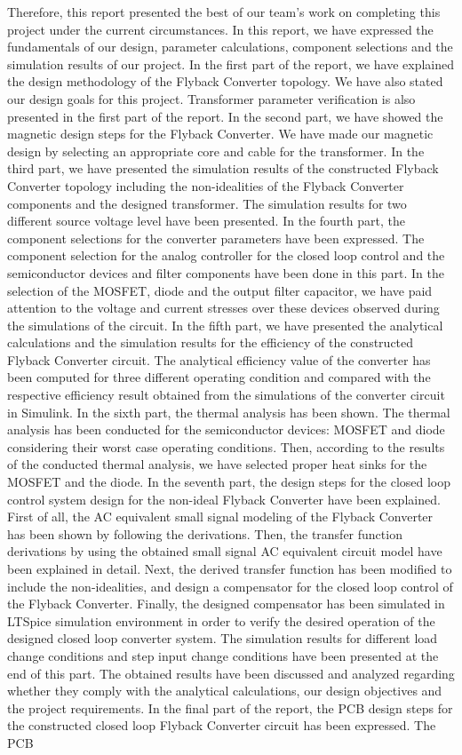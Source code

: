 Therefore, this report presented the best of our team's work on completing this project under the current circumstances. In this report, we have expressed the fundamentals of our design, parameter calculations, component selections and the simulation results of our project. In the first part of the report, we have explained the design methodology of the Flyback Converter topology. We have also stated our design goals for this project. Transformer parameter verification is also presented in the first part of the report. In the second part, we have showed the magnetic design steps for the Flyback Converter. We have made our magnetic design by selecting an appropriate core and cable for the transformer. In the third part, we have presented the simulation results of the constructed Flyback Converter topology including the non-idealities of the Flyback Converter components and the designed transformer. The simulation results for two different source voltage level have been presented. In the fourth part, the component selections for the converter parameters have been expressed. The component selection for the analog controller for the closed loop control and the semiconductor devices and filter components have been done in this part. In the selection of the MOSFET, diode and the output filter capacitor, we have paid attention to the voltage and current stresses over these devices observed during the simulations of the circuit. In the fifth part, we have presented the analytical calculations and the simulation results for the efficiency of the constructed Flyback Converter circuit. The analytical efficiency value of the converter has been computed for three different operating condition and compared with the respective efficiency result obtained from the simulations of the converter circuit in Simulink. In the sixth part, the thermal analysis has been shown. The thermal analysis has been conducted for the semiconductor devices: MOSFET and diode considering their worst case operating conditions. Then, according to the results of the conducted thermal analysis, we have selected proper heat sinks for the MOSFET and the diode. In the seventh part, the design steps for the closed loop control system design for the non-ideal Flyback Converter have been explained. First of all, the AC equivalent small signal modeling of the Flyback Converter has been shown by following the derivations. Then, the transfer function derivations by using the obtained small signal AC equivalent circuit model have been explained in detail. Next, the derived transfer function has been modified to include the non-idealities, and design a compensator for the closed loop control of the Flyback Converter. Finally, the designed compensator has been simulated in LTSpice simulation environment in order to verify the desired operation of the designed closed loop converter system. The simulation results for different load change conditions and step input change conditions have been presented at the end of this part. The obtained results have been discussed and analyzed regarding whether they comply with the analytical calculations, our design objectives and the project requirements. In the final part of the report, the PCB design steps for the constructed closed loop Flyback Converter circuit has been expressed. The PCB 